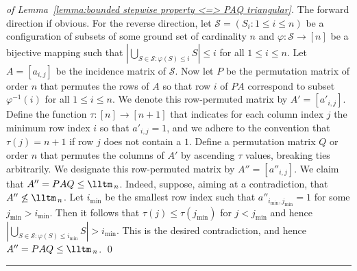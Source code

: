 \documentclass[a4paper,10pt]{llncs}
\newcommand{\horiz}{{\centering\rule{350pt}{.4pt}}}
\begin{document}
\begin{proof}[of Lemma~\ref{lemma:bounded stepwise property <=> PAQ triangular}]
The forward direction if obvious.
For the reverse direction,
let $\mathcal{S} = (S_i : 1 \leq i \leq n)$ be a configuration of subsets of
some ground set of cardinality $n$
and $\varphi : \mathcal{S} \to [n]$ be a bijective mapping
such that $\left|\bigcup_{S \in \mathcal{S} : \varphi(S) \leq i} S\right| \leq i$
for all $1\leq i \leq n$.
Let $A = [a_{i,j}]$ be the incidence matrix of $\mathcal{S}$.
Now let $P$ be the permutation matrix of order $n$ that permutes
the rows of $A$ so that row $i$ of $PA$ correspond to subset
$\varphi^{-1}(i)$ for all $1 \leq i \leq n$.
We denote this row-permuted matrix by $A' = [a'_{i,j}]$.
Define the function $\tau : [n] \to [n+1]$ that indicates for each column index
$j$ the minimum row index $i$ so that $a'_{i,j} = 1$, and we adhere to the convention
that $\tau(j) = n+1$ if row $j$ does not contain a $1$.
Define a permutation matrix $Q$ or order $n$ that permutes the
columns of $A'$ by ascending $\tau$ values,
breaking ties arbitrarily.
We designate this row-permuted matrix by $A'' = [a''_{i,j}]$.
We claim that $A'' = PAQ \leq \lltm_{\,n}$.
Indeed, suppose, aiming at a contradiction, that
$A'' \not\leq \lltm_{\,n}$.
Let $i_{\min}$ be the smallest row index such that
$a''_{i_{\min},j_{\min}} = 1$
for some $j_{\min} > i_{\min}$.
Then it follows that $\tau(j) \leq \tau(j_{\min})$ for $j < j_{\min}$
and hence
$\left|\bigcup_{S \in \mathcal{S} : \varphi(S) \leq i_{\min}} S\right| > i_{\min}$.
This is the desired contradiction, and hence
$A'' = PAQ \leq \lltm_{\,n}$.
\qed
\end{proof}

\horiz
\end{document}
